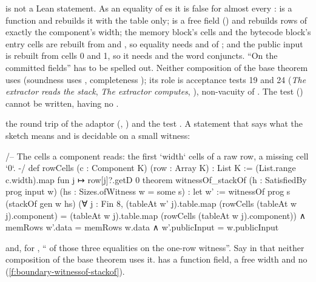  is not a Lean statement. As an equality of es it is
false for almost every :  is a function
and  rebuilds it with the  table only;  is a free field
() and  rebuilds rows of exactly the component's
width; the memory block's  cells and the bytecode block's entry cells are rebuilt from
 and , so equality needs  and  of
; and the public input is rebuilt from cells 0 and 1, so it needs 
and the word conjuncts. \enquote{On the committed fields} has to be spelled out. Neither
composition of the base theorem uses  (soundness uses
, completeness ); its role is acceptance tests 19
and 24 (\emph{The extractor reads the stack}, \emph{The extractor computes},
), non-vacuity of . The test
 () cannot be written, 
having no .

\begin{change}{the round trip of the adaptor (, )}
\asis {}
and the test .
\asproposed A statement that says what the sketch means and is decidable on a small witness:
\begin{leancode}
/-- The cells a component reads: the first `width` cells of a raw row, a missing cell `0`. -/
def rowCells (c : Component K) (row : Array K) : List K :=
  (List.range c.width).map fun j ↦ row[j]?.getD 0
theorem witnessOf_stackOf (h : SatisfiedBy prog input w) (hs : Sizes.ofWitness w = some s) :
    let w' := witnessOf prog s (stackOf gen w hs)
    (∀ j : Fin 8, (tableAt w' j).table.map (rowCells (tableAt w j).component) =
        (tableAt w j).table.map (rowCells (tableAt w j).component)) ∧
      memRows w'.data = memRows w.data ∧ w'.publicInput = w.publicInput
\end{leancode}
and, for , \enquote{ of those three equalities on the one-row witness}.
Say in  that neither composition of the base theorem uses it.
\reason {} has a function field, a free width and no 
(\cref{f:boundary-witnessof-stackof}).
\end{change}

